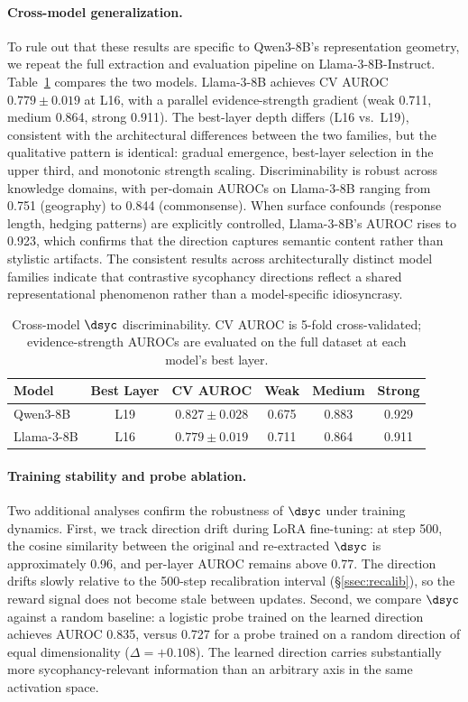 \paragraph{Cross-model generalization.}
To rule out that these results are specific to Qwen3-8B's representation geometry, we repeat the full extraction and evaluation pipeline on Llama-3-8B-Instruct.
Table~\ref{tab:cross_model} compares the two models.
Llama-3-8B achieves CV AUROC $0.779 \pm 0.019$ at L16, with a parallel evidence-strength gradient (weak 0.711, medium 0.864, strong 0.911).
The best-layer depth differs (L16 vs.\ L19), consistent with the architectural differences between the two families, but the qualitative pattern is identical: gradual emergence, best-layer selection in the upper third, and monotonic strength scaling.
Discriminability is robust across knowledge domains, with per-domain AUROCs on Llama-3-8B ranging from 0.751 (geography) to 0.844 (commonsense).
When surface confounds (response length, hedging patterns) are explicitly controlled, Llama-3-8B's AUROC rises to 0.923, which confirms that the direction captures semantic content rather than stylistic artifacts.
The consistent results across architecturally distinct model families indicate that contrastive sycophancy directions reflect a shared representational phenomenon rather than a model-specific idiosyncrasy.

\begin{table}[t]
\centering
\caption{Cross-model $\dsyc$ discriminability. CV AUROC is 5-fold cross-validated; evidence-strength AUROCs are evaluated on the full dataset at each model's best layer.}
\label{tab:cross_model}
\begin{tabular}{lccccc}
\toprule
Model & Best Layer & CV AUROC & Weak & Medium & Strong \\
\midrule
Qwen3-8B & L19 & $0.827{\pm}0.028$ & 0.675 & 0.883 & 0.929 \\
Llama-3-8B & L16 & $0.779{\pm}0.019$ & 0.711 & 0.864 & 0.911 \\
\bottomrule
\end{tabular}
\end{table}

\paragraph{Training stability and probe ablation.}
Two additional analyses confirm the robustness of $\dsyc$ under training dynamics.
First, we track direction drift during LoRA fine-tuning: at step 500, the cosine similarity between the original and re-extracted $\dsyc$ is approximately 0.96, and per-layer AUROC remains above 0.77.
The direction drifts slowly relative to the 500-step recalibration interval (\S\ref{ssec:recalib}), so the reward signal does not become stale between updates.
Second, we compare $\dsyc$ against a random baseline: a logistic probe trained on the learned direction achieves AUROC 0.835, versus 0.727 for a probe trained on a random direction of equal dimensionality ($\Delta{=}{+}0.108$).
The learned direction carries substantially more sycophancy-relevant information than an arbitrary axis in the same activation space.

